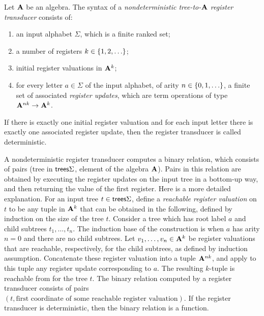 \begin{definition} Let $\mathbf{A}$ be an algebra. The syntax of a  \emph{nondeterministic tree-to-$\mathbf{A}$ register transducer} consists of:
    \begin{enumerate}
        \item an input alphabet $\Sigma$, which is a finite ranked set;
        \item a number of registers $k \in \{1,2,\ldots\}$;
        \item initial register valuations in $\mathbf{A}^{k}$;
        \item for every letter $a \in \Sigma$ of the input alphabet, of arity $n \in \{0,1,\ldots\}$, a finite set of  associated \emph{register updates}, which are  term operations of type  $\mathbf{A}^{nk} \to \mathbf{A}^k$. 
    \end{enumerate}
    If there is exactly one initial register valuation and for each input letter there is exactly one associated register update, then the register transducer is called deterministic. 
\end{definition}


A nondeterministic register transducer computes a binary relation, which consists of pairs (tree in ${\mathsf{trees}} \Sigma$, element of the algebra $\mathbf{A}$). Pairs in this relation are obtained by  executing the register updates on the input tree in a bottom-up way, and then returning the value of the first register. Here is a more detailed explanation.  For an input  tree $t \in {\mathsf{trees}} \Sigma$, define a \emph{reachable register valuation} on $t$ to be any tuple in $\mathbf{A}^k$ that  can be obtained in the following, defined by  induction on the size of the tree $t$. Consider a tree which has root label $a$ and child subtrees $t_1,\ldots,t_n$. The induction base of the construction is when $a$ has arity $n=0$ and there are no child subtrees. Let $v_1,\ldots,v_n \in \mathbf{A}^k$ be  register valuations that are reachable, respectively,  for the child subtrees, as defined by induction assumption. Concatenate these register valuation into a tuple $\mathbf{A}^{nk}$, and apply to this tuple any register update corresponding to $a$. The resulting $k$-tuple is reachable from for the tree $t$. The binary relation computed by a register transducer consists of pairs $(t,\text{first coordinate of some reachable register valuation})$. If the register transducer is deterministic, then the binary relation is a function. 

